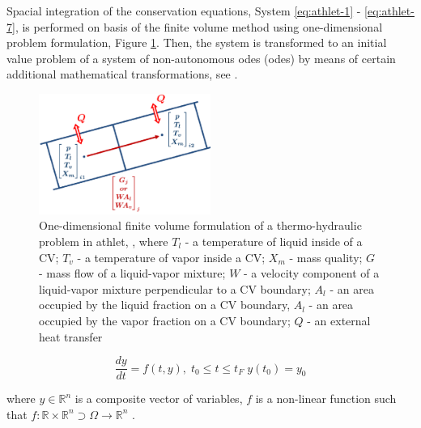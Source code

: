 Spacial integration of the conservation equations, System \ref{eq:athlet-1} - \ref{eq:athlet-7}, is performed on basis of the finite volume method using one-dimensional problem formulation, Figure \ref{fig:introduction-1d-fvm}. Then, the system is transformed to an initial value problem of a system of non-autonomous \acrlong{ode}s (\acrshort{ode}s) by means of certain additional mathematical transformations, see \cite{lt:ATHLMaM}.\\


\figpointer{\ref{fig:introduction-1d-fvm}}
\begin{figure}[htpb]
  \centering
  \includegraphics[width=0.5\textwidth]{figures/introduction-1d-fvm.png}
\caption[One-dimensional finite volume formulation of a thermo-hydraulic problem in \acrshort{athlet}]{One-dimensional finite volume formulation of a thermo-hydraulic problem in \acrshort{athlet}, \cite{tims-presentation}, where $T_l$ - a temperature of liquid inside of a CV; $T_v$ - a temperature of vapor inside a CV; $X_m$ - mass quality; $G$ - mass flow of a liquid-vapor mixture; $W$ - a velocity component of a liquid-vapor mixture perpendicular to a CV boundary; $A_l$ - an area occupied by the liquid fraction on a CV boundary, $A_l$ - an area occupied by the vapor fraction on a CV boundary; $Q$ - an external heat transfer}
\label{fig:introduction-1d-fvm}
\end{figure}




\begin{equation} \label{eq:athlet-8}
	\frac{dy}{dt} = f(t,y), \;  t_{0} \leq t \leq t_{F} \; y(t_{0}) = y_{0}
\end{equation}

where $y \in \mathbb{R}^{n}$ is a composite vector of variables, $f$ is a non-linear function such that $f : \mathbb{R} \times \mathbb{R}^{n} \supset \Omega  \rightarrow \mathbb{R}^{n}$  .\\


